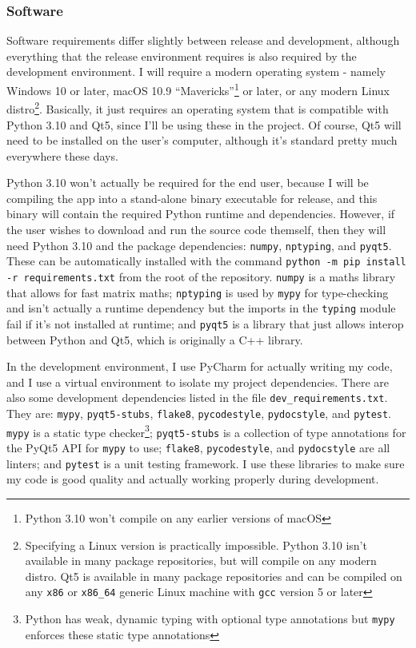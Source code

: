 \documentclass[../main.tex]{subfiles}
\begin{document}
\subsubsection{Software\label{analysis:hardware-and-software-requirements:software}}


Software requirements differ slightly between release and development, although everything that the release environment requires is also required by the development environment. I will require a modern operating system - namely Windows 10 or later, macOS 10.9 \enquote{Mavericks}\footnote{Python 3.10 won't compile on any earlier versions of macOS\cite{python-3-10-downloads-page}} or later, or any modern Linux distro\footnote{Specifying a Linux version is practically impossible. Python 3.10 isn't available in many package repositories, but will compile on any modern distro. Qt5 is available in many package repositories and can be compiled on any \texttt{x86} or \texttt{x86\_64} generic Linux machine with \texttt{gcc} version 5 or later\cite{qt5-linux-build-dependencies}}. Basically, it just requires an operating system that is compatible with Python 3.10 and Qt5, since I'll be using these in the project. Of course, Qt5 will need to be installed on the user's computer, although it's standard pretty much everywhere these days.

Python 3.10 won't actually be required for the end user, because I will be compiling the app into a stand-alone binary executable for release, and this binary will contain the required Python runtime and dependencies. However, if the user wishes to download and run the source code themself, then they will need Python 3.10 and the package dependencies: \texttt{numpy}, \texttt{nptyping}, and \texttt{pyqt5}. These can be automatically installed with the command \texttt{python -m pip install -r requirements.txt} from the root of the repository. \texttt{numpy} is a maths library that allows for fast matrix maths; \texttt{nptyping} is used by \texttt{mypy} for type-checking and isn't actually a runtime dependency but the imports in the \texttt{typing} module fail if it's not installed at runtime; and \texttt{pyqt5} is a library that just allows interop between Python and Qt5, which is originally a C++ library.

In the development environment, I use PyCharm for actually writing my code, and I use a virtual environment to isolate my project dependencies. There are also some development dependencies listed in the file \texttt{dev\_requirements.txt}. They are: \texttt{mypy}, \texttt{pyqt5-stubs}, \texttt{flake8}, \texttt{pycodestyle}, \texttt{pydocstyle}, and \texttt{pytest}. \texttt{mypy} is a static type checker\footnote{Python has weak, dynamic typing with optional type annotations but \texttt{mypy} enforces these static type annotations}; \texttt{pyqt5-stubs} is a collection of type annotations for the PyQt5 API for \texttt{mypy} to use; \texttt{flake8}, \texttt{pycodestyle}, and \texttt{pydocstyle} are all linters; and \texttt{pytest} is a unit testing framework. I use these libraries to make sure my code is good quality and actually working properly during development.
\end{document}
